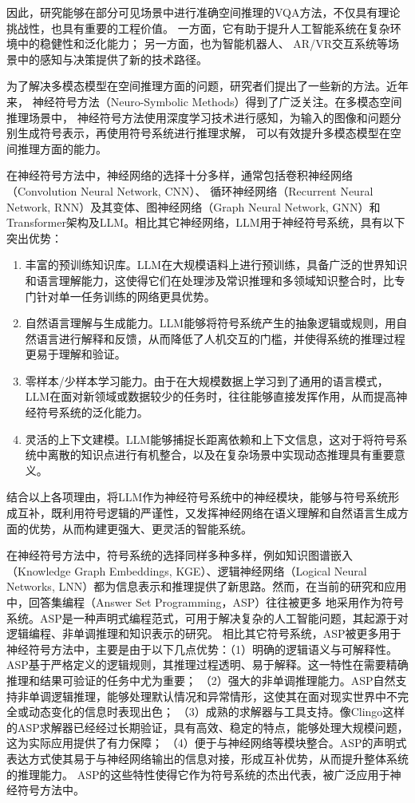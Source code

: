 因此，研究能够在部分可见场景中进行准确空间推理的VQA方法，不仅具有理论挑战性，也具有重要的工程价值。
一方面，它有助于提升人工智能系统在复杂环境中的稳健性和泛化能力；
另一方面，也为智能机器人\cite{gao2024physically}\cite{nasiriany2024pivot}、
AR/VR交互系统\cite{konenkov2024vr}等场景中的感知与决策提供了新的技术路径。

为了解决多模态模型在空间推理方面的问题，研究者们提出了一些新的方法。近年来，
神经符号方法（Neuro-Symbolic Methods）得到了广泛关注。在多模态空间推理场景中，
神经符号方法使用深度学习技术进行感知，为输入的图像和问题分别生成符号表示，再使用符号系统进行推理求解，
可以有效提升多模态模型在空间推理方面的能力。

在神经符号方法中，神经网络的选择十分多样，通常包括卷积神经网络（Convolution Neural Network, CNN）、
循环神经网络（Recurrent Neural Network, RNN）及其变体、图神经网络（Graph Neural Network, GNN）和
Transformer架构及LLM。相比其它神经网络，LLM用于神经符号系统，具有以下突出优势：
\begin{enumerate}[itemsep=0pt,parsep=0pt]
    \item 丰富的预训练知识库。LLM在大规模语料上进行预训练，具备广泛的世界知识和语言理解能力，这使得它们在处理涉及常识推理和多领域知识整合时，比专门针对单一任务训练的网络更具优势。
    \item 自然语言理解与生成能力。LLM能够将符号系统产生的抽象逻辑或规则，用自然语言进行解释和反馈，从而降低了人机交互的门槛，并使得系统的推理过程更易于理解和验证。
    \item 零样本/少样本学习能力。由于在大规模数据上学习到了通用的语言模式，LLM在面对新领域或数据较少的任务时，往往能够直接发挥作用，从而提高神经符号系统的泛化能力。
    \item 灵活的上下文建模。LLM能够捕捉长距离依赖和上下文信息，这对于将符号系统中离散的知识点进行有机整合，以及在复杂场景中实现动态推理具有重要意义。
\end{enumerate}
结合以上各项理由，将LLM作为神经符号系统中的神经模块，能够与符号系统形成互补，既利用符号逻辑的严谨性，又发挥神经网络在语义理解和自然语言生成方面的优势，从而构建更强大、更灵活的智能系统。

在神经符号方法中，符号系统的选择同样多种多样，例如知识图谱嵌入（Knowledge Graph Embeddings, KGE）、逻辑神经网络（Logical
 Neural Networks, LNN）都为信息表示和推理提供了新思路。然而，在当前的研究和应用中，回答集编程（Answer Set Programming，ASP）往往被更多
地采用作为符号系统。ASP是一种声明式编程范式，可用于解决复杂的人工智能问题，其起源于对逻辑编程、非单调推理和知识表示的研究。
相比其它符号系统，ASP被更多用于神经符号方法中，主要是由于以下几点优势：（1）明确的逻辑语义与可解释性。ASP基于严格定义的逻辑规则，其推理过程透明、易于解释。这一特性在需要精确推理和结果可验证的任务中尤为重要\cite{gelfond1988stable}；
（2）强大的非单调推理能力。ASP自然支持非单调逻辑推理，能够处理默认情况和异常情形，这使其在面对现实世界中不完全或动态变化的信息时表现出色\cite{gelfond1988stable}；
（3）成熟的求解器与工具支持。像Clingo这样的ASP求解器已经经过长期验证，具有高效、稳定的特点，能够处理大规模问题，这为实际应用提供了有力保障\cite{gebser2012answer}；
（4）便于与神经网络等模块整合。ASP的声明式表达方式使其易于与神经网络输出的信息对接，形成互补优势，从而提升整体系统的推理能力\cite{garcez2002neural}。
ASP的这些特性使得它作为符号系统的杰出代表，被广泛应用于神经符号方法中。

